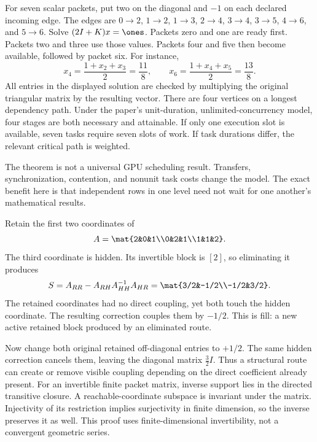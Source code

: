 For seven scalar packets, put two on the diagonal and $-1$ on each declared incoming edge. The edges are $0\to2$, $1\to2$, $1\to3$, $2\to4$, $3\to4$, $3\to5$, $4\to6$, and $5\to6$. Solve $(2I+K)x=\ones$.
Packets zero and one are ready first. Packets two and three use those values. Packets four and five then become available, followed by packet six. For instance,
\[
x_4=\frac{1+x_2+x_3}{2}=\frac{11}{8},\qquad
x_6=\frac{1+x_4+x_5}{2}=\frac{13}{8}.
\]
All entries in the displayed solution are checked by multiplying the original triangular matrix by the resulting vector.
There are four vertices on a longest dependency path. Under the paper's unit-duration, unlimited-concurrency model, four stages are both necessary and attainable. If only one execution slot is available, seven tasks require seven slots of work. If task durations differ, the relevant critical path is weighted.

The theorem is not a universal GPU scheduling result. Transfers, synchronization, contention, and nonunit task costs change the model. The exact benefit here is that independent rows in one level need not wait for one another's mathematical results.

Retain the first two coordinates of
\[
A=\mat{2&0&1\\0&2&1\\1&1&2}.
\]
The third coordinate is hidden. Its invertible block is $[2]$, so eliminating it produces
\[
S=A_{RR}-A_{RH}A_{HH}^{-1}A_{HR}
=\mat{3/2&-1/2\\-1/2&3/2}.
\]
The retained coordinates had no direct coupling, yet both touch the hidden coordinate. The resulting correction couples them by $-1/2$. This is fill: a new active retained block produced by an eliminated route.

Now change both original retained off-diagonal entries to $+1/2$. The same hidden correction cancels them, leaving the diagonal matrix $\frac32 I$. Thus a structural route can create or remove visible coupling depending on the direct coefficient already present.
For an invertible finite packet matrix, inverse support lies in the directed transitive closure. A reachable-coordinate subspace is invariant under the matrix. Injectivity of its restriction implies surjectivity in finite dimension, so the inverse preserves it as well. This proof uses finite-dimensional invertibility, not a convergent geometric series.

